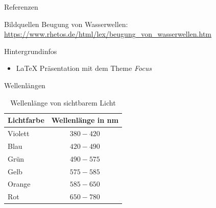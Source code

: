 \documentclass{beamer}
\begin{document}
\appendix

\begin{frame}{Referenzen}
    \nocite{*} %
    
    
\end{frame}

\begin{frame}{Bildquellen}
    Beugung von Wasserwellen: \\
    \url{https://www.rhetos.de/html/lex/beugung_von_wasserwellen.htm}
\end{frame}

\begin{frame}{Hintergrundinfos}
    \begin{itemize}
        \item \LaTeX{} Präsentation mit dem Theme \emph{Focus}
    \end{itemize}

\end{frame}

\begin{frame}{Wellenlängen}
    \begin{table}
        \centering %
        \begin{tabular}{l c}
            \toprule
            Lichtfarbe & Wellenlänge in nm \\
            \toprule
            Violett    & $380 - 420$       \\
            Blau       & $420 - 490$       \\
            Grün       & $490 - 575$       \\
            Gelb       & $575 - 585$       \\
            Orange     & $585 - 650$       \\
            Rot        & $650 - 780$       \\
            \bottomrule
        \end{tabular}
        \caption{Wellenlänge von sichtbarem Licht}
    \end{table}
\end{frame}

\end{document}
